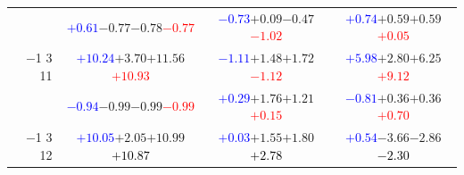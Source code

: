 \documentclass[compress]{beamer}
\begin{document}
\begin{frame}
\begin{tabular}{r | c | c | c}
          & \textcolor{blue}{$+0.61$}\hspace{0.1 cm}$-0.77$\hspace{0.1 cm}$-0.78$\hspace{0.1 cm}\textcolor{red}{$-0.77$} & \textcolor{blue}{$-0.73$}\hspace{0.1 cm}$+0.09$\hspace{0.1 cm}$-0.47$\hspace{0.1 cm}\textcolor{red}{$-1.02$} & \textcolor{blue}{$+0.74$}\hspace{0.1 cm}$+0.59$\hspace{0.1 cm}$+0.59$\hspace{0.1 cm}\textcolor{red}{$+0.05$} \\
$-$1 3 11 & \textcolor{blue}{$+10.24$}\hspace{0.1 cm}$+3.70$\hspace{0.1 cm}$+11.56$\hspace{0.1 cm}\textcolor{red}{$+10.93$} & \textcolor{blue}{$-1.11$}\hspace{0.1 cm}$+1.48$\hspace{0.1 cm}$+1.72$\hspace{0.1 cm}\textcolor{red}{$-1.12$} & \textcolor{blue}{$+5.98$}\hspace{0.1 cm}$+2.80$\hspace{0.1 cm}$+6.25$\hspace{0.1 cm}\textcolor{red}{$+9.12$} \\
          & \textcolor{blue}{$-0.94$}\hspace{0.1 cm}$-0.99$\hspace{0.1 cm}$-0.99$\hspace{0.1 cm}\textcolor{red}{$-0.99$} & \textcolor{blue}{$+0.29$}\hspace{0.1 cm}$+1.76$\hspace{0.1 cm}$+1.21$\hspace{0.1 cm}\textcolor{red}{$+0.15$} & \textcolor{blue}{$-0.81$}\hspace{0.1 cm}$+0.36$\hspace{0.1 cm}$+0.36$\hspace{0.1 cm}\textcolor{red}{$+0.70$} \\
$-$1 3 12 & \textcolor{blue}{$+10.05$}\hspace{0.1 cm}$+2.05$\hspace{0.1 cm}$+10.99$\hspace{0.1 cm}\textcolor{black}{$+10.87$} & \textcolor{blue}{$+0.03$}\hspace{0.1 cm}$+1.55$\hspace{0.1 cm}$+1.80$\hspace{0.1 cm}\textcolor{black}{$+2.78$} & \textcolor{blue}{$+0.54$}\hspace{0.1 cm}$-3.66$\hspace{0.1 cm}$-2.86$\hspace{0.1 cm}\textcolor{black}{$-2.30$} \\

\end{tabular}
\end{frame}
\end{document}
